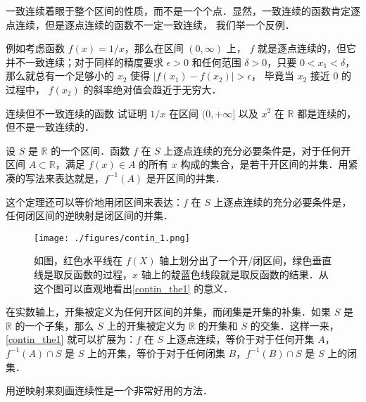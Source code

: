 一致连续着眼于整个区间的性质，而不是一个个点．显然，一致连续的函数肯定逐点连续，但是逐点连续的函数不一定一致连续， 我们举一个反例．

\begin{example}{}
例如考虑函数 $f(x)=1/x$，那么在区间 $(0, \infty)$ 上， $f$ 就是逐点连续的，但它并不一致连续；对于同样的精度要求 $\epsilon>0$ 和任何范围 $\delta>0$，只要 $0<x_1<\delta$，那么就总有一个足够小的 $x_2$ 使得 $|f(x_1)-f(x_2)|>\epsilon$， 毕竟当 $x_2$ 接近 $0$ 的过程中， $f(x_2)$ 的斜率绝对值会趋近于无穷大．
\end{example}

\begin{exercise}{连续但不一致连续的函数}
试证明 $1/x$ 在区间 $(0, +\infty]$ 以及 $x^2$ 在 $\mathbb R$ 都是连续的， 但不是一致连续的．
\end{exercise}

\begin{theorem}{}\label{contin_the1}
设 $S$ 是 $\mathbb{R}$ 的一个区间．函数 $f$ 在 $S$ 上逐点连续的充分必要条件是，对于任何开区间 $A\subset \mathbb{R}$，满足 $f(x)\in A$ 的所有 $x$ 构成的集合，是若干开区间的并集．用紧凑的写法来表达就是，$f^{-1}(A)$ 是开区间的并集．
\end{theorem}

这个定理还可以等价地用闭区间来表达：$f$ 在 $S$ 上逐点连续的充分必要条件是，任何闭区间的逆映射是闭区间的并集．

\begin{figure}[ht]
\centering
\texttt{[image: ./figures/contin\_1.png]}
\caption{如图，红色水平线在 $f(X)$ 轴上划分出了一个开/闭区间，绿色垂直线是取反函数的过程，$x$ 轴上的靛蓝色线段就是取反函数的结果．从这个图可以直观地看出\autoref{contin_the1} 的意义．} \label{contin_fig1}
\end{figure}

在实数轴上，开集被定义为任何开区间的并集，而闭集是开集的补集．如果 $S$ 是 $\mathbb{R}$ 的一个子集，那么 $S$ 上的开集被定义为 $\mathbb{R}$ 的开集和 $S$ 的交集．这样一来，\autoref{contin_the1} 就可以扩展为：$f$ 在 $S$ 上逐点连续，等价于对于任何开集 $A$，$f^{-1}(A)\cap S$ 是 $S$ 上的开集，等价于对于任何闭集 $B$，$f^{-1}(B)\cap S$ 是 $S$ 上的闭集．

用逆映射来刻画连续性是一个非常好用的方法．
